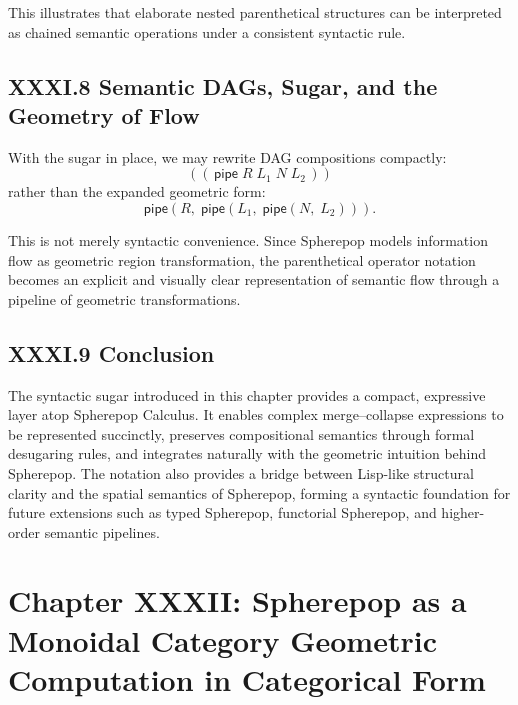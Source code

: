 \documentclass[11pt,letterpaper]{article}
\begin{document}
This illustrates that elaborate nested parenthetical structures can be interpreted as chained semantic operations under a consistent syntactic rule.

\subsection{XXXI.8 Semantic DAGs, Sugar, and the Geometry of Flow}

With the sugar in place, we may rewrite DAG compositions compactly:
\[
((\,\mathsf{pipe}\; R\; L_1\; N\; L_2\,))
\]
rather than the expanded geometric form:
\[
\mathsf{pipe}(R,\; \mathsf{pipe}(L_1,\; \mathsf{pipe}(N,\; L_2))).
\]

This is not merely syntactic convenience. Since Spherepop models information flow as geometric region transformation, the parenthetical operator notation becomes an explicit and visually clear representation of semantic flow through a pipeline of geometric transformations.

\subsection{XXXI.9 Conclusion}

The syntactic sugar introduced in this chapter provides a compact, expressive layer atop Spherepop Calculus. It enables complex merge--collapse expressions to be represented succinctly, preserves compositional semantics through formal desugaring rules, and integrates naturally with the geometric intuition behind Spherepop. The notation also provides a bridge between Lisp-like structural clarity and the spatial semantics of Spherepop, forming a syntactic foundation for future extensions such as typed Spherepop, functorial Spherepop, and higher-order semantic pipelines.

\newpage

\section{Chapter XXXII: Spherepop as a Monoidal Category  
Geometric Computation in Categorical Form}
\end{document}
